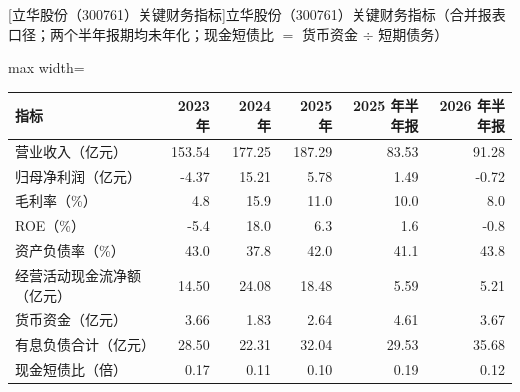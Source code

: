 \begin{center}\small\setlength{\tabcolsep}{3.4pt}
[立华股份（300761）关键财务指标]{立华股份（300761）关键财务指标（合并报表口径；两个半年报期均未年化；现金短债比 $=$ 货币资金 $\div$ 短期债务）}
\begin{adjustbox}{max width=\textwidth}
\begin{tabular}{@{}lrrrrr@{}}
\toprule
指标 & 2023 年 & 2024 年 & 2025 年 & 2025 年半年报 & 2026 年半年报 \\
\midrule
营业收入（亿元） & 153.54 & 177.25 & 187.29 & 83.53 & 91.28 \\
归母净利润（亿元） & -4.37 & 15.21 & 5.78 & 1.49 & -0.72 \\
毛利率（\%） & 4.8 & 15.9 & 11.0 & 10.0 & 8.0 \\
ROE（\%） & -5.4 & 18.0 & 6.3 & 1.6 & -0.8 \\
资产负债率（\%） & 43.0 & 37.8 & 42.0 & 41.1 & 43.8 \\
经营活动现金流净额（亿元） & 14.50 & 24.08 & 18.48 & 5.59 & 5.21 \\
货币资金（亿元） & 3.66 & 1.83 & 2.64 & 4.61 & 3.67 \\
有息负债合计（亿元） & 28.50 & 22.31 & 32.04 & 29.53 & 35.68 \\
现金短债比（倍） & 0.17 & 0.11 & 0.10 & 0.19 & 0.12 \\
\bottomrule
\end{tabular}
\end{adjustbox}
\end{center}

